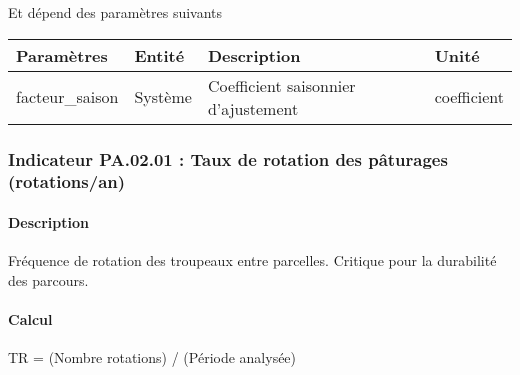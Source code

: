 \documentclass[
]{article}
\newenvironment{Shaded}{\begin{snugshade}}{\end{snugshade}}
\newcommand{\NormalTok}[1]{#1}
\begin{document}
Et dépend des paramètres suivants

\begin{longtable}[]{@{}
  >{\raggedright\arraybackslash}p{}
  >{\raggedright\arraybackslash}p{}
  >{\raggedright\arraybackslash}p{}
  >{\raggedright\arraybackslash}p{}@{}}
\toprule\noalign{}
\begin{minipage}[b]{\linewidth}\raggedright
\textbf{Paramètres}
\end{minipage} & \begin{minipage}[b]{\linewidth}\raggedright
\textbf{Entité}
\end{minipage} & \begin{minipage}[b]{\linewidth}\raggedright
\textbf{Description}
\end{minipage} & \begin{minipage}[b]{\linewidth}\raggedright
\textbf{Unité}
\end{minipage} \\
\midrule\noalign{}
\endhead
\bottomrule\noalign{}
\endlastfoot
facteur\_saison & Système & Coefficient saisonnier d'ajustement &
coefficient \\
\end{longtable}

\subsubsection{Indicateur PA.02.01 : Taux de rotation des pâturages
(rotations/an)}\label{indicateur-pa.02.01-taux-de-rotation-des-puxe2turages-rotationsan}

\paragraph{Description}\label{description-1}

Fréquence de rotation des troupeaux entre parcelles. Critique pour la
durabilité des parcours.

\paragraph{Calcul}\label{calcul-1}

\begin{Shaded}
\begin{Highlighting}[]
\NormalTok{TR = (Nombre rotations) / (Période analysée)}
\end{Highlighting}
\end{Shaded}
\end{document}
